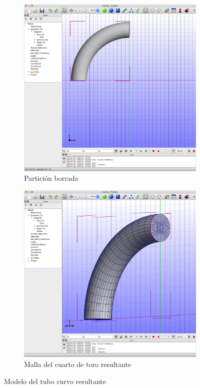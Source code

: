 \begin{figure}[!htp]
\centering
\begin{subfigure}[b]{0.48\textwidth}
\includegraphics[width=\linewidth]{figuras_4/03b_Model-partition-deleted.png}
\caption{Partición borrada}
\label{fig:03b_Model-partition-deleted}
\end{subfigure}
\begin{subfigure}[b]{0.48\textwidth}
\includegraphics[width=\linewidth]{figuras_4/03d_Model-view-mesh.png}
\caption{Malla del cuarto de toro resultante}
\label{fig:03d_Model-view-mesh}
\end{subfigure}
\caption{Modelo del tubo curvo resultante}
\label{fig:03bd}
\end{figure}

